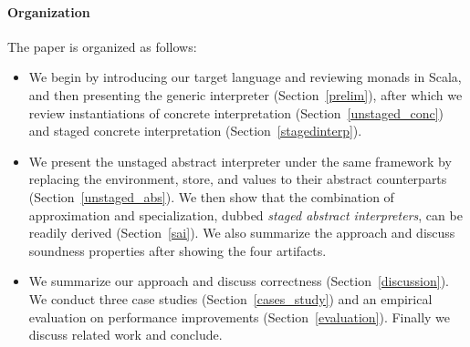 \paragraph{Organization} The paper is organized as follows:
\begin{itemize}[leftmargin=2em]
  \item We begin by introducing our target language and reviewing
    monads in Scala, and then presenting the generic interpreter
    (Section~\ref{prelim}), after which we review instantiations
    of concrete interpretation (Section~\ref{unstaged_conc}) and
    staged concrete interpretation (Section~\ref{stagedinterp}).
  \item We present the unstaged abstract interpreter under the same
    framework by replacing the environment, store, and values to their
    abstract counterparts (Section~\ref{unstaged_abs}). We then
    show that the combination of approximation and specialization, dubbed
    \textit{staged abstract interpreters}, can be readily derived
    (Section~\ref{sai}). We also summarize the approach and discuss
    soundness properties after showing the four artifacts.
  \item We summarize our approach and discuss correctness (Section~\ref{discussion}).
    We conduct three case studies (Section~\ref{cases_study}) and
    an empirical evaluation on performance improvements (Section~\ref{evaluation}).
    Finally we discuss related work and conclude.
\end{itemize}

\iffalse
On the other side, static analysis is a trade-off between performance and
precision: higher precision usually leads to longer running time.

4. Existing method to improve the performance is adhoc, engineering heavy, require to rewrite the optimized version, therefore harder to reason about the correctness
6. program analyzers are also meta-programs, they manipulate other programs as data objects
\fi

